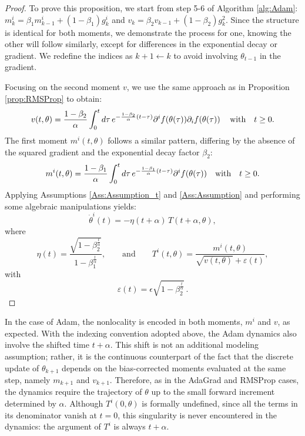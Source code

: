 \documentclass{article} %
\newcommand{\D}{{\rm d}}
\begin{document}
\begin{proof}
To prove this proposition, we start from step 5-6 of Algorithm \ref{alg:Adam}: \(m^i_{k} = \beta_1 m^i_{k-1} + (1 - \beta_1) g^i_{k}\) and \(v_{k} = \beta_2 v_{k-1} + (1 - \beta_2) g^2_{k}\). Since the structure is identical for both moments, we demonstrate the process for one, knowing the other will follow similarly, except for differences in the exponential decay or gradient. We redefine the indices as \(k+1 \leftarrow k\) to avoid involving \(\theta_{t-1}\) in the gradient.

Focusing on the second moment \(v\), we use the same approach as in Proposition \ref{prop:RMSProp} to obtain:
\begin{equation}
v(t,\theta) = \frac{1-\beta_2}{\alpha} \int^t_0 \D \tau \, e^{-\frac{1-\beta_2}{\alpha}(t-\tau)} \partial^i f(\theta(\tau)) \partial_i f(\theta(\tau))\, \quad \text{with} \quad t\geq 0.
\end{equation}
The first moment \(m^i(t,\theta)\) follows a similar pattern, differing by the absence of the squared gradient and the exponential decay factor \(\beta_2\):
\begin{equation}
m^i(t,\theta) = \frac{1-\beta_1}{\alpha} \int^t_0 \D \tau \, e^{-\frac{1-\beta_1}{\alpha}(t-\tau)} \partial^i f(\theta(\tau)) \quad \text{with} \quad t \geq 0.
\end{equation}
Applying Assumptions \ref{Ass:Assumption_t} and \ref{Ass:Assumption} and performing some algebraic manipulations yields:
\begin{equation}\label{eq:Adam1cont}
\dot{\theta}^i(t) = - \eta(t+\alpha)\,T(t+\alpha,\theta),
\end{equation}
where
\begin{equation}
    \eta(t) = \frac{\sqrt{1-\beta_2^{\frac{t}{\alpha}}}}{1-\beta_1^{\frac{t}{\alpha}}} , \qquad \text{and} \qquad T^i(t,\theta) = \frac{m^i(t,\theta)}{\sqrt{v(t,\theta)}+\varepsilon (t)},
\end{equation}
with 
\[
\varepsilon(t) = \epsilon\sqrt{1-\beta_2^\frac{t}{\alpha}}\,.
\]
\end{proof}
In the case of Adam, the nonlocality is encoded in both moments, \(m^i\) and \(v\), as expected. With the indexing convention adopted
above, the Adam dynamics also involve the shifted time \(t+\alpha\). This shift is not an additional modeling assumption; rather, it is the
continuous counterpart of the fact that the discrete update of \(\theta_{k+1}\) depends on the bias-corrected moments evaluated at the same step, namely \(m_{k+1}\) and \(v_{k+1}\). Therefore, as in the AdaGrad and RMSProp cases, the dynamics require the trajectory of \(\theta\) up to the small forward increment determined by \(\alpha\). Although \(T^i(0,\theta)\) is formally undefined, since all the terms in its denominator vanish at \(t=0\), this singularity is never encountered in the dynamics: the argument of \(T^i\) is always \(t+\alpha\).
\end{document}
